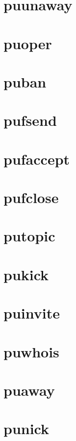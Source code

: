 \documentclass[twoside]{book}
\begin{document}
\chapter{puunaway}
\label{puunaway}
\hypertarget{puunaway}{}

\chapter{puoper}
\label{puoper}
\hypertarget{puoper}{}

\chapter{puban}
\label{puban}
\hypertarget{puban}{}

\chapter{pufsend}
\label{pufsend}
\hypertarget{pufsend}{}

\chapter{pufaccept}
\label{pufaccept}
\hypertarget{pufaccept}{}

\chapter{pufclose}
\label{pufclose}
\hypertarget{pufclose}{}

\chapter{putopic}
\label{putopic}
\hypertarget{putopic}{}

\chapter{pukick}
\label{pukick}
\hypertarget{pukick}{}

\chapter{puinvite}
\label{puinvite}
\hypertarget{puinvite}{}

\chapter{puwhois}
\label{puwhois}
\hypertarget{puwhois}{}

\chapter{puaway}
\label{puaway}
\hypertarget{puaway}{}

\chapter{punick}
\label{punick}
\hypertarget{punick}{}

\end{document}
